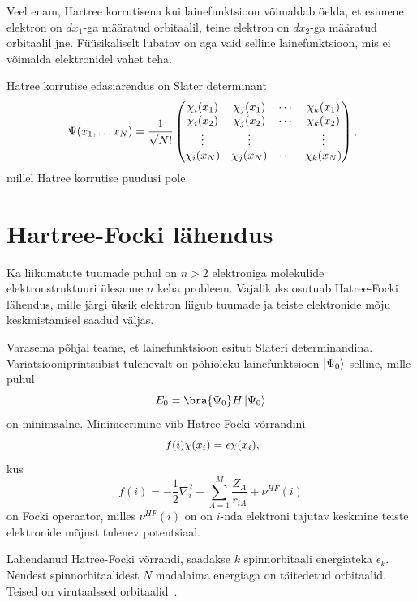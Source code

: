 \documentclass[12pt]{report}
\def\ket#1{\mathinner{|#1\rangle}}
\begin{document}
Veel enam, Hartree korrutisena kui lainefunktsioon võimaldab öelda, et esimene elektron
on \(dx_1\)-ga määratud orbitaalil, teine elektron on \(dx_2\)-ga määratud orbitaalil jne. Füüsikaliselt lubatav on aga vaid selline lainefunktsioon, mis ei võimalda elektronidel vahet teha.

Hatree korrutise edasiarendus on Slater determinant
\begin{equation}
    \Psi(x_1,\ldots x_N) = \frac{1}{\sqrt{N!}}\begin{pmatrix}
        \chi_i(x_1) & \chi_j(x_1) & \cdots & \chi_k(x_1) \\
        \chi_i(x_2) & \chi_j(x_2) & \cdots & \chi_k(x_2) \\
        \vdots & \vdots & & \vdots \\
        \chi_i(x_N) & \chi_j(x_N) & \cdots & \chi_k(x_N) \\
    \end{pmatrix}\rlap{,}
\end{equation}
millel Hatree korrutise puudusi pole.

\section{Hartree-Focki lähendus}\label{hatree-fock}

Ka liikumatute tuumade puhul on \(n > 2\) elektroniga molekulide elektronstruktuuri ülesanne \(n\) keha probleem.
Vajalikuks osutuab Hatree-Focki lähendus, mille järgi üksik elektron liigub tuumade ja teiste elektronide mõju keskmistamisel saadud väljas.

Varasema põhjal teame, et lainefunktsioon esitub Slateri determinandina.
Variatsiooniprintsiibist tulenevalt on põhioleku lainefunktsioon \(\ket{\Psi_0}\) selline, mille puhul
\begin{equation}
    E_0=\bra{\Psi_0}H\ket{\Psi_0}
\end{equation}
on minimaalne.
Minimeerimine viib Hatree-Focki võrrandini
\begin{equation}
    f(i)\chi(x_i)=\epsilon\chi(x_i)\rlap{,}
\end{equation}
kus
\begin{equation}
    f(i) = -\frac{1}{2}\nabla_i^2-\sum_{A=1}^M\frac{Z_A}{r_{iA}}+\nu^{HF}(i)
\end{equation}
on Focki operaator, milles \(\nu^{HF}(i)\) on on \(i\)-nda elektroni tajutav keskmine teiste elektronide mõjust tulenev potentsiaal.

Lahendanud Hatree-Focki võrrandi, saadakse \(k\) spinnorbitaali energiateka \(\epsilon_k\).
Nendest spinnorbitaalidest \(N\) madalaima energiaga on täitedetud orbitaalid.
Teised on virutaalssed orbitaalid~\cite{szab0+ostlnud}.
\end{document}
